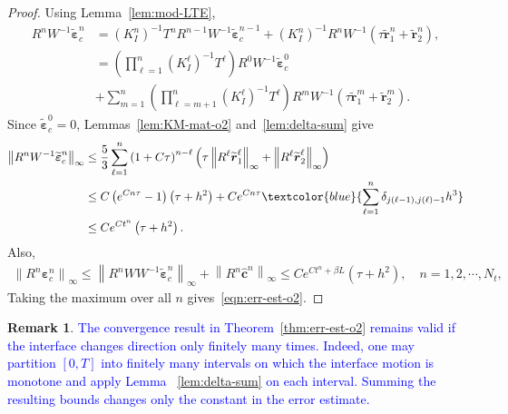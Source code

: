 \documentclass[11pt,reqno]{amsart}
\theoremstyle{plain}
\theoremstyle{definition}
\newtheorem{remark}[theorem]{Remark}
\numberwithin{equation}{section}
\newcommand{\paren}[1]{\left(#1\right)}
\newcommand{\wh}[1]{\widehat{#1}}
\newcommand{\wt}[1]{\widetilde{#1}}
\newcommand{\bm}[1]{\boldsymbol{#1}}
\newcommand{\norm}[1]{\left\lVert #1 \right\rVert}
\begin{document}
\begin{proof}
Using Lemma~\ref{lem:mod-LTE},
\begin{equation}
\begin{aligned}
    R^nW^{-1}\wt{\bm\varepsilon}_c^n
    &= (K_I^n)^{-1}T^n R^{n-1}W^{-1}\wt{\bm\varepsilon}_c^{n-1}
    +  (K_I^n)^{-1} R^nW^{-1}\paren{\tau\wt{\bm r}_1^n + \wt{\bm r}_2^n}, \\
    &= \paren{\prod_{\ell=1}^n (K_I^\ell)^{-1}T^\ell }R^0 W^{-1}\wt{\bm\varepsilon}_c^0 \\
    &+  \sum_{m=1}^n\paren{\prod_{\ell=m+1}^n (K_I^\ell)^{-1}T^\ell }R^m W^{-1}\paren{\tau\wt{\bm r}_1^m + \wt{\bm r}_2^m}.
\end{aligned}
\end{equation}
Since $\wt{\bm\varepsilon}_c^0=0$, Lemmas~\ref{lem:KM-mat-o2} and~\ref{lem:delta-sum} give
\begin{equation}
\begin{aligned}
    \norm{R^nW^{-1}\wt{\bm\varepsilon}_c^n}_\infty & \le \frac{5}{3} \sum_{\ell=1}^n \paren{1+C\tau}^{n-\ell}  \paren{\tau \norm{R^\ell\wt{\bm r}_1^\ell}_\infty + \norm{R^\ell\wt{\bm r}_2^\ell}_\infty} \\
    & \le C \paren{e^{Cn\tau}-1}\paren{\tau +h^2} + Ce^{Cn\tau}
    \textcolor{blue}{\sum_{\ell=1}^n \delta_{j(\ell-1), j(\ell)-1} h^3}\\
    & \le C e^{Ct^n} \paren{\tau +h^2} .
\end{aligned}
\end{equation}
Also,
\begin{equation}
\begin{aligned}
    \norm{R^n\bm\varepsilon_c^n}_\infty
    \le \norm{R^nW W^{-1}\wt{\bm\varepsilon}_c^n}_\infty
    + \norm{R^n\wh{\bm c}^n}_\infty
    \le  C e^{Ct^n+\beta L}  \paren{\tau +h^2},\quad n = 1,2,\cdots, N_t,
\end{aligned}
\end{equation}
Taking the maximum over all $n$ gives~\eqref{eqn:err-est-o2}.
\end{proof}

\begin{remark}
\textcolor{blue}{The convergence result in Theorem~\ref{thm:err-est-o2} remains valid if the interface changes direction only
finitely many times. Indeed, one may partition $[0,T]$ into finitely many
intervals on which the interface motion is monotone and apply Lemma~
\ref{lem:delta-sum} on each interval. Summing the resulting
bounds changes only the constant in the error estimate.}
\end{remark}
\end{document}
